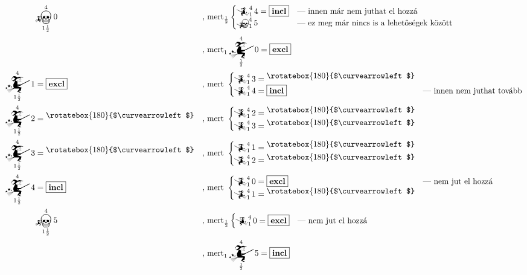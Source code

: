 \documentclass{article}
\newcommand{\nothing}{\text{\raisebox{0.4em}{\rotatebox{180}{$\curvearrowleft$}}}}%
\newcommand{\just}[1]{\boxed{#1}}%
\newcommand{\incl}{\mathbf{incl}}
\newcommand{\excl}{\mathbf{excl}}
\newcommand{\mainfunA}[3]{\mathwitch_{#2}^{#1}#3}
\newcommand{\mainfunB}[3]{\reversemathwitch_{#2}^{#1}#3}
\newcommand{\nomainfunA}[3]{{}_{\mathwitch}\!\!\!\!\bigskull^{#1}_{#2}#3}
\newcommand{\nomainfunB}[3]{{}_{\reversemathwitch}\!\!\!\!\bigskull^{#1}_{#2}#3}
\newcommand{\storm}{\mathcloud\mspace{-42mu}\lightning\mspace{3mu}\lightning\mspace{20mu}}
\begin{document}
	\begin{align*}
		&\nomainfunA4{1\frac12}0              &&\text{, mert}_{\frac12}\begin{cases}\mainfunB414 = \just\incl&\text{--- innen már nem juthat el hozzá}\\\nomainfunB415&\text{--- ez meg már nincs is a lehetőségek között}\end{cases} \\
		&                                    &&\text{, mert}_1\mainfunA4{\frac12}0 = \just\excl\\
		\mainfunA4{1\frac12}1  &= \just\excl  &&\text{, mert }\begin{cases}\mainfunB413 = \nothing\\\mainfunB414 = \just\incl&\text{--- innen nem juthat tovább}\end{cases} \\
		\mainfunA4{1\frac12}2  &= \nothing    &&\text{, mert }\begin{cases}\mainfunB412 = \nothing\\\mainfunB413 = \nothing&\end{cases} \\
		\mainfunA4{1\frac12}3  &= \nothing    &&\text{, mert }\begin{cases}\mainfunB411 = \nothing\\\mainfunB412 = \nothing&\end{cases} \\
		\mainfunA4{1\frac12}4  &= \just\incl  &&\text{, mert }\begin{cases}\mainfunB410 = \just\excl&\text{--- nem jut el hozzá}\\\mainfunB411 = \nothing&\end{cases} \\%
		&\nomainfunA4{1\frac12}5              &&\text{, mert}_{\frac12}\begin{cases}\mainfunB410 = \just\excl&\text{--- nem jut el hozzá}\end{cases}\\
		&                                    &&\text{, mert}_1 \mainfunA4{\frac12}5 = \just\incl
	\end{align*}
\end{document}
